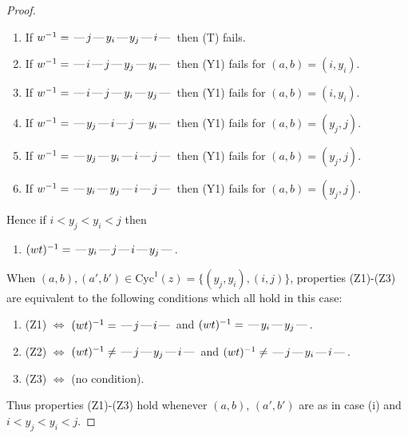 \documentclass[10pt]{article}
\theoremstyle{definition}
\theoremstyle{definition}
\def\dash{\text{\hspace{0.5mm}---\hspace{0.5mm}}}
\def\Cyc{\mathrm{Cyc}}
\begin{document}
\begin{proof}
\begin{enumerate}
\item If $w^{-1} = \dash j\dash y_i\dash y_j\dash i\dash $ then (T) fails.
\item If $w^{-1} = \dash i\dash j\dash y_j\dash y_i\dash $ then (Y1) fails for $(a,b)=(i,y_i)$.
\item If $w^{-1} = \dash i\dash j\dash y_i\dash y_j\dash $ then (Y1) fails for $(a,b)=(i,y_i)$.
\item If $w^{-1} = \dash y_j\dash i\dash j\dash y_i\dash $ then (Y1) fails for $(a,b)=(y_j,j)$.
\item If $w^{-1} = \dash y_j\dash y_i\dash i\dash j\dash $ then (Y1) fails for $(a,b)=(y_j,j)$.
\item If $w^{-1} = \dash y_i\dash y_j\dash i\dash j\dash $ then (Y1) fails for $(a,b)=(y_j,j)$.
\end{enumerate}
Hence if $i < y_j < y_i < j$ then \begin{enumerate}\item[] $(wt)^{-1} = \dash y_i\dash j\dash i\dash y_j\dash $. \end{enumerate}
When $(a,b),(a',b')\in\Cyc^1(z)= \{(y_j,y_i),(i,j)\}$,
properties (Z1)-(Z3) are equivalent to the following conditions which all hold in this case:
\begin{enumerate}
\item[](Z1) $\Leftrightarrow$ $(wt)^{-1} = \dash j \dash i \dash$  and $(wt)^{-1} = \dash y_i \dash y_j \dash$.
\item[](Z2) $\Leftrightarrow$ $(wt)^{-1} \neq \dash j \dash y_j \dash i \dash$ and $(wt)^{-1}\neq \dash j \dash y_i \dash i \dash$.
\item[](Z3) $\Leftrightarrow$ (no condition).
\end{enumerate}
Thus properties (Z1)-(Z3) hold whenever $(a,b)$, $(a',b')$ are as in case (i) and $i < y_j < y_i < j$.

\end{proof}
\end{document}
